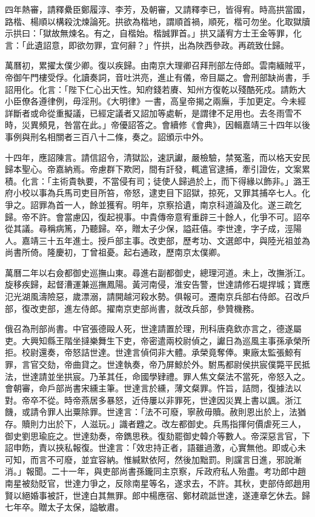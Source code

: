 \begin{pinyinscope}
四年熱審，請釋纍臣鄭履淳、李芳，及朝審，又請釋李已，皆得宥。時高拱當國，路楷、楊順以構殺沈煉論死。拱欲為楷地，謂順首禍，順死，楷可勿坐。化取獄牘示拱曰：「獄故無煉名。有之，自楷始。楷誠罪首。」拱又議宥方士王金等罪，化言：「此遺詔意，即欲勿罪，宜何辭？」忤拱，出為陜西參政。再疏致仕歸。

萬曆初，累擢太僕少卿。復以疾歸。由南京大理卿召拜刑部左侍郎。雲南緬賊平，帝御午門樓受俘。化讀奏詞，音吐洪亮，進止有儀，帝目屬之。會刑部缺尚書，手詔用化。化言：「陛下仁心出天性。知府錢若賡、知州方復乾以殘酷死戍。請飭大小臣僚各遵律例，毋淫刑。《大明律》一書，高皇帝揭之兩廡，手加更定。今未經詳斷者或命從重擬議，已經定議者又詔加等處斬，是謂律不足用也。去冬雨雪不時，災異頻見，咎當在此。」帝優詔答之。會續修《會典》，因輯嘉靖三十四年以後事例與刑名相關者三百八十二條，奏之。詔頒示中外。

十四年，應詔陳言。請信詔令，清獄訟，速訊讞，嚴檢驗，禁冤濫，而以格天安民歸本聖心。帝嘉納焉。帝慮群下欺罔，間有訐發，輒遣官逮捕，牽引證佐，文案累積。化言：「主術貴執要，不當侵有司；徒使人歸過於上，而下得緣以飾非。」潞王府小校以事為兵馬司吏目所笞，帝怒，逮吏目下詔獄，掠死，又罪其捕卒七人。化爭之。詔罪為首一人，餘並獲宥。明年，京察拾遺，南京科道論及化。遂三疏乞歸。帝不許。會當慮囚，復起視事。中貴傳帝意宥重辟三十餘人，化爭不可。詔卒從其議。尋稱病篤，乃聽歸。卒，贈太子少保，謚莊僖。李世達，字子成，涇陽人。嘉靖三十五年進士。授戶部主事。改吏部，歷考功、文選郎中，與陸光祖並為尚書所倚。隆慶初，丁曾祖憂。起右通政，歷南京太僕卿。

萬曆二年以右僉都御史巡撫山東。尋進右副都御史，總理河道。未上，改撫浙江。旋移疾歸，起督漕運兼巡撫鳳陽。黃河南侵，淮安告警，世達請修石堤捍城；寶應氾光湖風濤險惡，歲漂溺，請開越河殺水勢。俱報可。遷南京兵部右侍郎。召改戶部，復改吏部，進左侍郎。擢南京吏部尚書，就改兵部，參贊機務。

俄召為刑部尚書。中官張德毆人死，世達請置於理，刑科唐堯欽亦言之，德遂屬吏。大興知縣王階坐撻樂舞生下吏，帝密遣兩校尉偵之，讞日為巡風主事孫承榮所拒。校尉還奏，帝怒詰世達。世達言偵伺非大體。承榮竟奪俸。東廠太監張鯨有罪，言官交劾，帝曲貸之。世達執奏，帝乃屏鯨於外。駙馬都尉侯拱宸僕斃平民抵法，世達請並坐拱宸。乃革其任，命國學肄禮。罪人焦文粲法不當死，帝怒入之。會朝審，命戶部尚書宋纁主筆。世達言於纁，薄文粲罪。忤旨，詰問，復據法以對。帝卒不從。時帝燕居多暴怒，近侍屢以非罪死，世達因災異上書以諷。浙江饑，或請令罪人出粟除罪。世達言：「法不可廢，寧赦毋贖。赦則恩出於上，法猶存。贖則力出於下，人滋玩。」識者韙之。改左都御史。兵馬指揮何價虐死三人，御史劉思瑜庇之。世達劾奏，帝鐫思秩。復劾罷御史韓介等數人。帝深惡言官，下詔申飭，責以挾私報復。世達言：「效忠持正者，語雖過激，心實無他。即或心未可知，而言不可廢，並宜容納。惟緘默依阿，然後加黜罰。則讜言日進，邪說漸消。」報聞。二十一年，與吏部尚書孫鑨同主京察，斥政府私人殆盡。考功郎中趙南星被劾貶官，世達力爭之，反除南星等名，遂求去，不許。其秋，吏部侍郎趙用賢以絕婚事被訐，世達白其無罪。郎中楊應宿、鄭材疏詆世達，遂連章乞休去。歸七年卒。贈太子太保，謚敏肅。


\end{pinyinscope}
